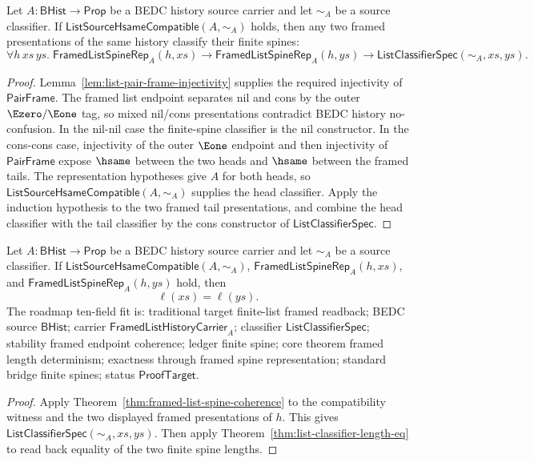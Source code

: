 
\begin{theorem}
\label{thm:framed-list-spine-coherence}
Let $A:\mathsf{BHist}\to\mathsf{Prop}$ be a BEDC history source carrier and let
$\sim_A$ be a source classifier. If
$\mathsf{ListSourceHsameCompatible}(A,\sim_A)$ holds, then any two framed
presentations of the same history classify their finite spines:
$$
\forall h\,xs\,ys.\;
\mathsf{FramedListSpineRep}_A(h,xs)\to
\mathsf{FramedListSpineRep}_A(h,ys)\to
\mathsf{ListClassifierSpec}(\sim_A,xs,ys).
$$
\end{theorem}
\begin{proof}
Lemma~\ref{lem:list-pair-frame-injectivity} supplies the required injectivity
of $\mathsf{PairFrame}$. The framed list endpoint separates nil and cons by
the outer $\Ezero/\Eone$ tag, so mixed nil/cons presentations contradict BEDC
history no-confusion. In the nil-nil case the finite-spine classifier is the nil
constructor. In the cons-cons case, injectivity of the outer $\Eone$ endpoint
and then injectivity of $\mathsf{PairFrame}$ expose $\hsame$ between the two
heads and $\hsame$ between the framed tails. The representation hypotheses give
$A$ for both heads, so $\mathsf{ListSourceHsameCompatible}(A,\sim_A)$ supplies
the head classifier. Apply the induction hypothesis to the two framed tail
presentations, and combine the head classifier with the tail classifier by the
cons constructor of $\mathsf{ListClassifierSpec}$.
\end{proof}

\begin{theorem}
\label{thm:framed-list-spine-length-determinism}
Let $A:\mathsf{BHist}\to\mathsf{Prop}$ be a BEDC history source carrier and let
$\sim_A$ be a source classifier. If
$\mathsf{ListSourceHsameCompatible}(A,\sim_A)$,
$\mathsf{FramedListSpineRep}_A(h,xs)$, and
$\mathsf{FramedListSpineRep}_A(h,ys)$ hold, then
$$
\ell(xs)=\ell(ys).
$$
The roadmap ten-field fit is: traditional target finite-list framed readback; BEDC source $\mathsf{BHist}$; carrier $\mathsf{FramedListHistoryCarrier}_A$; classifier $\mathsf{ListClassifierSpec}$; stability framed endpoint coherence; ledger finite spine; core theorem framed length determinism; exactness through framed spine representation; standard bridge finite spines; status $\mathsf{ProofTarget}$.
\end{theorem}
\begin{proof}
Apply Theorem~\ref{thm:framed-list-spine-coherence} to the compatibility
witness and the two displayed framed presentations of $h$. This gives
$\mathsf{ListClassifierSpec}(\sim_A,xs,ys)$. Then apply
Theorem~\ref{thm:list-classifier-length-eq} to read back equality of the two
finite spine lengths.
\end{proof}

